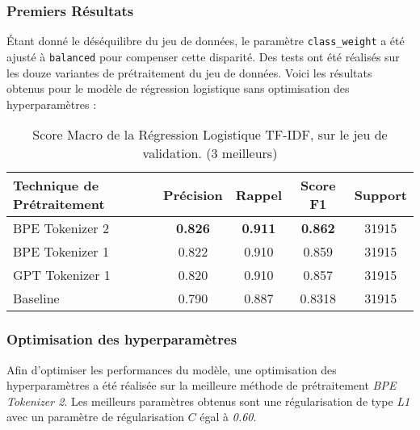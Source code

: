 \subsubsection{Premiers Résultats}
Étant donné le déséquilibre du jeu de données, le paramètre \texttt{class\_weight} a été ajusté à \texttt{balanced} pour compenser cette disparité. 
Des tests ont été réalisés sur les douze variantes de prétraitement du jeu de données.
Voici les résultats obtenus pour le modèle de régression logistique sans optimisation des hyperparamètres :

\begin{table}[ht]
    \centering
    \caption{Score Macro de la Régression Logistique TF-IDF, sur le jeu de validation. (3 meilleurs)}
    \begin{tabular}{lcccc}
    \hline
    \textbf{Technique de Prétraitement} & \textbf{Précision} & \textbf{Rappel} & \textbf{Score F1} & \textbf{Support} \\ \hline
    BPE Tokenizer 2                       & \textbf{0.826}         & \textbf{0.911}         & \textbf{0.862}             & 31915            \\
    BPE Tokenizer 1                           & 0.822              & 0.910                   & 0.859             & 31915            \\
    GPT Tokenizer 1                              & 0.820              & 0.910                & 0.857             & 31915            \\ \hline
    Baseline                & 0.790              & 0.887           & 0.8318             & 31915            \\ \hline
    \end{tabular}
    \label{tab:results}
    \end{table}

\subsubsection{Optimisation des hyperparamètres}
Afin d'optimiser les performances du modèle, une optimisation des hyperparamètres a été réalisée sur la meilleure méthode de prétraitement \textit{BPE Tokenizer 2}. 
Les meilleurs paramètres obtenus sont une régularisation de type \textit{L1} avec un paramètre de régularisation $C$ égal à \textit{0.60}.

